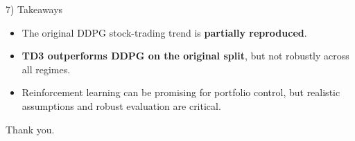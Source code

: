 \documentclass[aspectratio=169]{beamer}
\begin{document}
\begin{frame}{7) Takeaways}
  \begin{itemize}
    \item The original DDPG stock-trading trend is \textbf{partially reproduced}.
    \item \textbf{TD3 outperforms DDPG on the original split}, but not robustly across all regimes.
    \item Reinforcement learning can be promising for portfolio control, but
      realistic assumptions and robust evaluation are critical.
  \end{itemize}

  \vspace{1em}
  \centering
  \Large Thank you.

  \vspace{0.5em}
  \normalsize
\end{frame}

\end{document}
